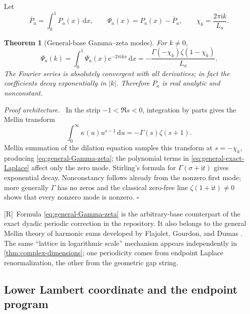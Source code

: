 \documentclass[11pt,oneside]{article}
\newtheorem{theorem}{Theorem}[section]
\theoremstyle{definition}
\theoremstyle{remark}
\newcommand{\e}{\mathrm e}
\newcommand{\ii}{\mathrm i}
\newcommand{\dd}{\,\mathrm d}
\newcommand{\Rmark}{\textcolor{sourceblue}{\textsf{[R]}}}
\newenvironment{proofidea}{\par\smallskip\noindent\textit{Proof architecture.}\ }{\hfill$\square$\par\smallskip}
\begin{document}
Let
\begin{equation}
 \overline P_a=\int_0^1P_a(x)\dd x,
 \qquad \Psi_a(x)=P_a(x)-\overline P_a,
 \qquad
 \chi_k=\frac{2\pi\ii k}{L_a}.
 \label{eq:Psi-a}
\end{equation}

\begin{theorem}[General-base Gamma--zeta modes]
\label{thm:general-Fourier-modes}
For $k\ne0$,
\begin{equation}
 \boxed{\quad
 \widehat\Psi_a(k)=\int_0^1\Psi_a(x)\e^{-2\pi\ii kx}\dd x
 =-\frac{\Gamma(-\chi_k)\zeta(1-\chi_k)}{L_a}.
 \quad}
 \label{eq:general-Gamma-zeta}
\end{equation}
The Fourier series is absolutely convergent with all derivatives; in fact the coefficients
decay exponentially in $|k|$.  Therefore $P_a$ is real analytic and nonconstant.
\end{theorem}

\begin{proofidea}
In the strip $-1<\Re s<0$, integration by parts gives the Mellin transform
\begin{equation}
 \int_0^\infty\kappa(u)u^{s-1}\dd u
 =-\Gamma(s)\zeta(s+1).
 \label{eq:Mellin-kappa}
\end{equation}
Mellin summation of the dilation equation samples this transform at
$s=-\chi_k$, producing \eqref{eq:general-Gamma-zeta}; the polynomial terms in
\eqref{eq:general-exact-Laplace} affect only the zero mode.  Stirling's formula for
$\Gamma(\sigma+\ii t)$ gives exponential decay.  Nonconstancy follows already from the
nonzero first mode; more generally $\Gamma$ has no zeros and the classical zero-free line
$\zeta(1+\ii t)\ne0$ shows that every nonzero mode is nonzero.
\end{proofidea}

\Rmark\ Formula \eqref{eq:general-Gamma-zeta} is the arbitrary-base counterpart of the exact
dyadic periodic correction in the repository.  It also belongs to the general Mellin theory
of harmonic sums developed by Flajolet, Gourdon, and Dumas \cite{flajolet1995}.  The same
``lattice in logarithmic scale'' mechanism appears independently in
\cref{thm:complex-dimensions}; one periodicity comes from endpoint Laplace renormalization,
the other from the geometric gap string.

\subsection{Lower Lambert coordinate and the endpoint program}
\end{document}
